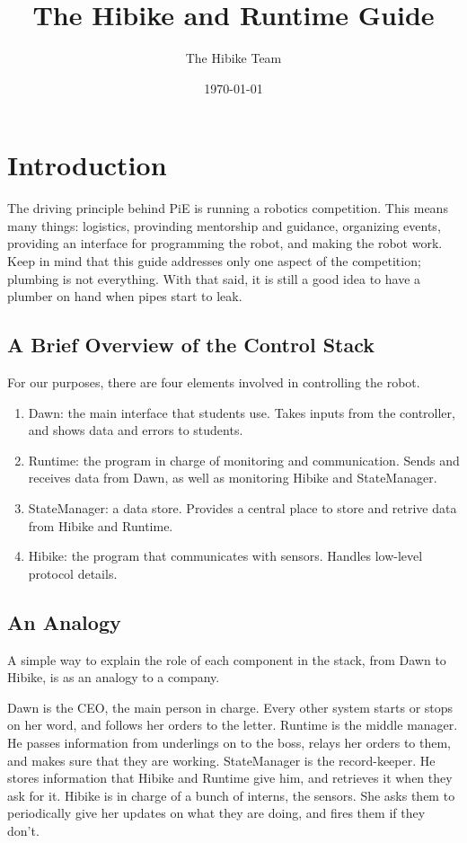 \documentclass[12pt]{book}
\title{The Hibike and Runtime Guide}
\date{\today}
\author{The Hibike Team}
\begin{document}
\maketitle

\tableofcontents

\chapter{Introduction}
The driving principle behind PiE is running a robotics competition. This means many things:
logistics, provinding mentorship and guidance, organizing events,
providing an interface for programming the robot, and making
the robot work. Keep in mind that this guide addresses only one aspect
of the competition; plumbing is not everything. With that said, it is still a good
idea to have a plumber on hand when pipes start to leak.
\section{A Brief Overview of the Control Stack}
For our purposes, there are four elements involved in controlling the robot.
\begin{enumerate}
	\item Dawn: the main interface that students use. Takes inputs from the controller,
	and shows data and errors to students.
	\item Runtime: the program in charge of monitoring and communication. Sends and receives data from
	Dawn, as well as monitoring Hibike and StateManager.
	\item StateManager: a data store. Provides a central place to store and retrive data from Hibike
	and Runtime.
	\item Hibike: the program that communicates with sensors. Handles low-level protocol details.
\end{enumerate}
\section{An Analogy}
A simple way to explain the role of each component in the stack, from Dawn to Hibike, is
as an analogy to a company.

Dawn is the CEO, the main person in charge. Every other system starts or stops
on her word, and follows her orders to the letter. Runtime is the middle manager. He
passes information from underlings on to the boss, relays her orders to them, and makes
sure that they are working. StateManager is the record-keeper. He stores information
that Hibike and Runtime give him, and retrieves it when they ask for it. Hibike is
in charge of a bunch of interns, the sensors. She asks them to periodically give her
updates on what they are doing, and fires them if they don't.
\end{document}
